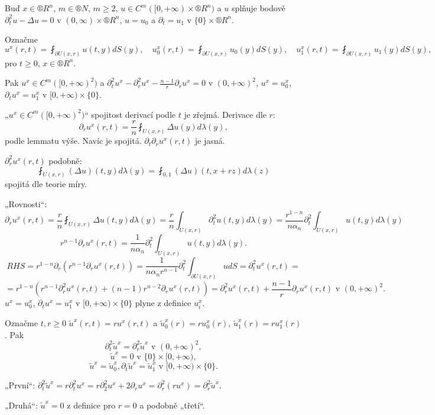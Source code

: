 \documentclass[12pt]{article}					%
\begin{document}
\begin{lemma}
	Buď $x \in ®R^n$, $m \in ®N$, $m ≥ 2$, $u \in C^m([0, +∞) \times ®R^n)$ a $u$ splňuje bodově $\partial_t^2 u - \Delta  u = 0$ v $(0, ∞) \times ®R^n$, $u = u_0$ a $\partial_t = u_1$ v $\{0\} \times ®R^n$.

	Označme
	$$ u^x(r, t) = \fint_{\partial U(x, r)}\!\!\! u(t, y) dS(y), \quad u_0^x(r, t) = \fint_{\partial U(x, r)}\!\!\! u_0(y) dS(y), \quad u_1^x(r, t) = \fint_{\partial U(x, r)}\!\!\! u_1(y) dS(y), $$
	pro $t ≥ 0$, $x \in ®R^n$.

	Pak $u^x \in C^m([0, +∞)^2)$ a $\partial_t^2 u^x - \partial_r^2 u^x - \frac{n-1}{r} \partial_r u^x = 0$ v $(0, +∞)^2$, $u^x = u_0^x$, $\partial_t u^x = u_1^x$ v $[0, +∞)\times\{0\}$.

	\begin{dukazin}
		„$u^x \in C^m([0, +∞)^2)$“ spojitost derivací podle $t$ je zřejmá. Derivace dle $r$:
		$$ \partial_r u^x(r, t) = \frac{r}{n} \fint_{U(x, r)} \Delta u(y) d\lambda(y), $$
		podle lemmatu výše. Navíc je spojitá. $\partial_t\partial_r u^x(r, t)$ je jasná.

		$\partial_r^2 u^x(r, t)$ podobně:
		$$ \fint_{U(x, r)} (\Delta u)(t, y) d\lambda(y) = \fint_{0, 1}(\Delta u)(t, x + rz) d\lambda(z) $$
		spojitá dle teorie míry.

		„Rovnosti“:
		$$ \partial_r u^x(r, t) = \frac{r}{n} \fint_{U(x, r)} \Delta u(t, y) d\lambda(y) = \frac{r}{n} \int_{U(x, r)} \partial_t^2 u(t, y) d\lambda(y) = \frac{r^{1 - n}}{n \alpha_n} \partial_t^2 \int_{U(x, r)} u(t, y) d\lambda(y) $$
		$$ r^{n-1} \partial_r u^x(r, t) = \frac{1}{n\alpha_n} \partial_t^2 \int_{U(x, r)} u(t, y) d\lambda(y). $$
		$$ RHS = r^{1 - n} \partial_r(r^{n-1} \partial_r u^x(r, t)) = \frac{1}{n\alpha_n r^{n-1}} \partial_t^2 \int_{\partial U(x, r)} u dS = \partial_t^2 u^x(r, t) = $$
		$$ = r^{1 - n}(r^{n-1} \partial_r^2 u^x(r, t) + (n-1)r^{n-2} \partial_r u^x(r, t)) = \partial_r^2 u^x(r, t) + \frac{n-1}{r} \partial_r u^x(r, t) \text{ v } (0, +∞)^2. $$
		$u^x = u_0^x$, $\partial_t u^x = u_1^x$ v $[0, +∞) \times \{0\}$ plyne z definice $u_i^x$.
	\end{dukazin}
\end{lemma}

\begin{lemma}[Doplnění pro $n=3$]
	Označme $t, r ≥ 0$ $\tilde u^x(r, t) = r u^x(r, t)$ a $\tilde u_0^x(r) = r u_0^x(r)$, $\tilde u_1^x(r) = r u_1^x(r)$. Pak
	$$ \partial_t^2 \tilde u^x = \partial_r^2 \tilde u^x \text{ v } (0, +∞)^2, $$
	$$ \tilde u^x = 0 \text{ v } \{0\} \times [0, +∞), $$
	$$ \tilde u^x = \tilde u_0^x, \partial_t \tilde u^x = \tilde u_1^x \text{ v } [0, +∞) \times \{0\}. $$

	\begin{dukazin}
		„První“: $\partial_t^2 \tilde u^x = r \partial_t^2 u^x = r\partial_2^2 u^x + 2\partial_r u^x = \partial_r^2 (r u^x) = \partial_r^2 \tilde u^x$.

		„Druhá“: $\tilde u^x = 0$ z definice pro $r = 0$ a podobně „třetí“.
	\end{dukazin}
\end{lemma}
\end{document}
